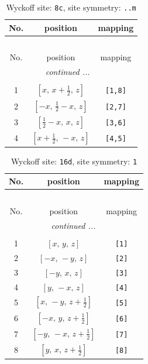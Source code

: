 \documentclass[fleqn,8pt]{jsarticle}
\begin{document}
\renewcommand{\arraystretch}{1.2}
\begin{longtable}{ccc}
\caption{Wyckoff site: {\tt 8c}, site symmetry: {\tt ..m}}
 \\
 \hline \hline
No. & position & mapping \\ \hline \endfirsthead

\multicolumn{2}{l}{\tablename\ \thetable{}} \\
 \hline \hline
No. & position & mapping \\ \hline \endhead

 \hline \hline
\multicolumn{2}{r}{\footnotesize\it continued ...} \\ \endfoot

 \hline \hline
\multicolumn{2}{r}{} \\ \endlastfoot

1 & $\left[ x,\, x + \frac{1}{2},\, z \right]$ & {\tt [1,8]} \\ \hline
2 & $\left[ - x,\, \frac{1}{2} - x,\, z \right]$ & {\tt [2,7]} \\ \hline
3 & $\left[ \frac{1}{2} - x,\, x,\, z \right]$ & {\tt [3,6]} \\ \hline
4 & $\left[ x + \frac{1}{2},\, - x,\, z \right]$ & {\tt [4,5]} \\
\end{longtable}
\renewcommand{\arraystretch}{1.2}
\begin{longtable}{ccc}
\caption{Wyckoff site: {\tt 16d}, site symmetry: {\tt 1}}
 \\
 \hline \hline
No. & position & mapping \\ \hline \endfirsthead

\multicolumn{2}{l}{\tablename\ \thetable{}} \\
 \hline \hline
No. & position & mapping \\ \hline \endhead

 \hline \hline
\multicolumn{2}{r}{\footnotesize\it continued ...} \\ \endfoot

 \hline \hline
\multicolumn{2}{r}{} \\ \endlastfoot

1 & $\left[ x,\, y,\, z \right]$ & {\tt [1]} \\ \hline
2 & $\left[ - x,\, - y,\, z \right]$ & {\tt [2]} \\ \hline
3 & $\left[ - y,\, x,\, z \right]$ & {\tt [3]} \\ \hline
4 & $\left[ y,\, - x,\, z \right]$ & {\tt [4]} \\ \hline
5 & $\left[ x,\, - y,\, z + \frac{1}{2} \right]$ & {\tt [5]} \\ \hline
6 & $\left[ - x,\, y,\, z + \frac{1}{2} \right]$ & {\tt [6]} \\ \hline
7 & $\left[ - y,\, - x,\, z + \frac{1}{2} \right]$ & {\tt [7]} \\ \hline
8 & $\left[ y,\, x,\, z + \frac{1}{2} \right]$ & {\tt [8]} \\
\end{longtable}
\end{document}
